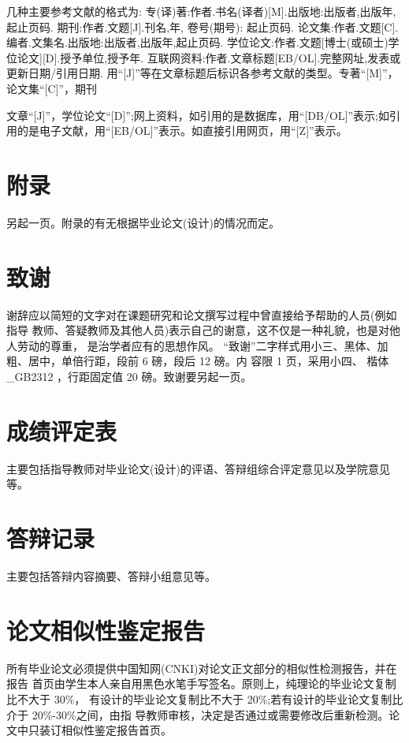 几种主要参考文献的格式为: 专(译)著:作者.书名(译者)[M].出版地:出版者,出版年,起止页码. 期刊:作者.文题[J].刊名,年, 卷号(期号): 起止页码. 论文集:作者.文题[C].编者.文集名.出版地:出版者,出版年,起止页码. 学位论文:作者.文题[博士(或硕士)学位论文][D].授予单位,授予年. 互联网资料:作者.文章标题[EB/OL].完整网址,发表或更新日期/引用日期. 用“[J]”等在文章标题后标识各参考文献的类型。专著“[M]”，论文集“[C]”，期刊

文章“[J]”，学位论文“[D]”;网上资料，如引用的是数据库，用“[DB/OL]”表示;如引 用的是电子文献，用“[EB/OL]”表示。如直接引用网页，用“[Z]”表示。
\section{附录}
另起一页。附录的有无根据毕业论文(设计)的情况而定。

\section{致谢}
 
 谢辞应以简短的文字对在课题研究和论文撰写过程中曾直接给予帮助的人员(例如指导 教师、答疑教师及其他人员)表示自己的谢意，这不仅是一种礼貌，也是对他人劳动的尊重， 是治学者应有的思想作风。
  “致谢”二字样式用小三、黑体、加粗、居中，单倍行距，段前 6 磅，段后 12 磅。内 容限 1 页，采用小四、 楷体\_GB2312 ，行距固定值 20 磅。致谢要另起一页。
  
\section{ 成绩评定表 }
主要包括指导教师对毕业论文(设计)的评语、答辩组综合评定意见以及学院意见等。
\section{答辩记录}
主要包括答辩内容摘要、答辩小组意见等。
\section{论文相似性鉴定报告}
所有毕业论文必须提供中国知网(CNKI)对论文正文部分的相似性检测报告，并在报告 首页由学生本人亲自用黑色水笔手写签名。原则上，纯理论的毕业论文复制比不大于 30\%， 有设计的毕业论文复制比不大于 20\%;若有设计的毕业论文复制比介于 20\%-30\%之间，由指 导教师审核，决定是否通过或需要修改后重新检测。论文中只装订相似性鉴定报告首页。

